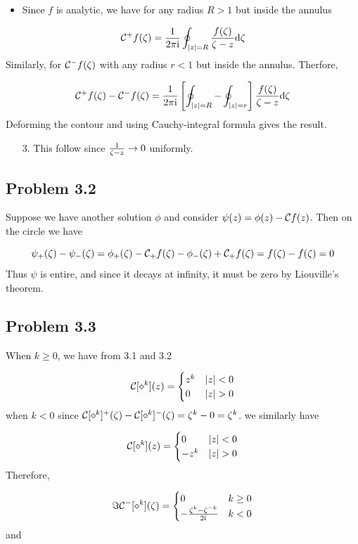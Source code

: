 \documentclass[12pt,a4paper]{article}
\def\D{ {\rm d} }
\def\I{ {\rm i} }
\def\CC{ {\cal C} }
\begin{document}
\begin{itemize}
\item Since $f$ is analytic, we have for any radius $R > 1$ but inside the annulus

\end{itemize}
\[
\CC^+ f(\zeta) = {1 \over 2 \pi \I} \oint_{|z| = R} {f(\zeta) \over \zeta -z} \D\zeta
\]
Similarly, for $\CC^-f(\zeta)$ with any radius $r < 1$ but inside the annulus. Therfore,

\[
\CC^+ f(\zeta) - \CC^- f(\zeta) = {1 \over 2 \pi \I} \left[\oint_{|z| = R} - \oint_{|z| = r} \right] {f(\zeta) \over \zeta -z} \D\zeta
\]
Deforming the contour and using Cauchy-integral formula gives the result. 

\begin{itemize}
\item[3. ] This follow since ${1 \over \zeta - z} \rightarrow 0$ uniformly.

\end{itemize}
\subsection{Problem 3.2}
Suppose we have another solution $\phi$ and consider $\psi(z) = \phi(z) - \CC f(z)$. Then on the circle we have

\[
\psi_+(\zeta) - \psi_-(\zeta) = \phi_+(\zeta) - \CC_+f(\zeta) - \phi_-(\zeta) + \CC_+f(\zeta) = f(\zeta)-f(\zeta) = 0
\]
Thus $\psi$ is entire, and since it decays at infinity, it must be zero by Liouville's theorem.

\subsection{Problem 3.3}
When $k \geq 0$, we have from 3.1 and 3.2

\[
\CC[\diamond^k](z) =\begin{cases}
    z^k  & |z| < 0 \\
    0 & |z| > 0
    \end{cases}
\]
when $k < 0$ since $\CC[\diamond^k]^+(\zeta) - \CC[\diamond^k]^-(\zeta) = \zeta^k - 0 = \zeta^k$. we similarly have 

\[
\CC[\diamond^k](z) =\begin{cases}
0  & |z| < 0 \\
    -z^k & |z| > 0
        \end{cases}
\]
Therefore,

\[
\Im \CC^-[\diamond^k](\zeta) =\begin{cases}
0  & k \geq 0 \\
    -{\zeta^k - \zeta^{-k} \over 2 \I} & k < 0
        \end{cases}
\]
and
\end{document}
